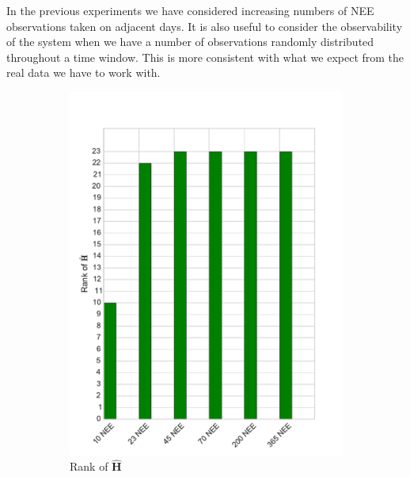 \documentclass[11pt]{article}
\begin{document}
In the previous experiments we have considered increasing numbers of NEE observations taken on adjacent days. It is also useful to consider the observability of the system when we have a number of observations randomly distributed throughout a time window. This is more consistent with what we expect from the real data we have to work with.  

\begin{figure}[ht]
    \centering
    \begin{subfigure}[b]{0.4\textwidth}
        \includegraphics[width=\textwidth]{dalec2_obsrankwind.pdf}
        \caption{Rank of $\hat{\textbf{H}}$}
        \label{fig:D2_observailityrankwind}
    \end{subfigure}
    \begin{subfigure}[b]{0.4\textwidth}

\end{subfigure}
\end{figure}
\end{document}
